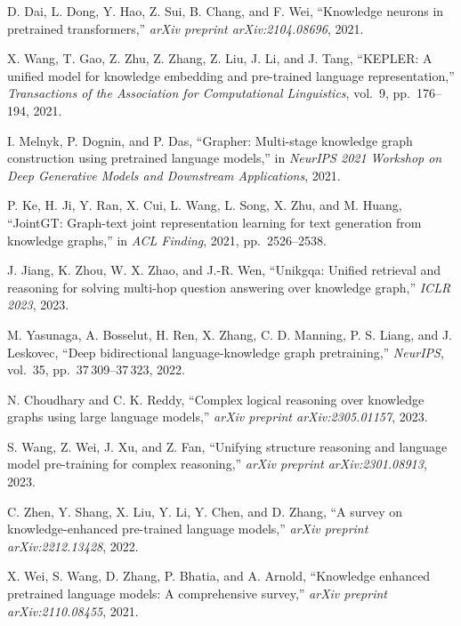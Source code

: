 \begin{enumerate}[leftmargin=2em,label={[\arabic*]}]
\item D. Dai, L. Dong, Y. Hao, Z. Sui, B. Chang, and F. Wei, ``Knowledge neurons in pretrained transformers,'' \textit{arXiv preprint arXiv:2104.08696}, 2021.

\item X. Wang, T. Gao, Z. Zhu, Z. Zhang, Z. Liu, J. Li, and J. Tang, ``KEPLER: A unified model for knowledge embedding and pre-trained language representation,'' \textit{Transactions of the Association for Computational Linguistics}, vol.~9, pp.~176--194, 2021.

\item I. Melnyk, P. Dognin, and P. Das, ``Grapher: Multi-stage knowledge graph construction using pretrained language models,'' in \textit{NeurIPS 2021 Workshop on Deep Generative Models and Downstream Applications}, 2021.

\item P. Ke, H. Ji, Y. Ran, X. Cui, L. Wang, L. Song, X. Zhu, and M. Huang, ``JointGT: Graph-text joint representation learning for text generation from knowledge graphs,'' in \textit{ACL Finding}, 2021, pp.~2526--2538.

\item J. Jiang, K. Zhou, W. X. Zhao, and J.-R. Wen, ``Unikgqa: Unified retrieval and reasoning for solving multi-hop question answering over knowledge graph,'' \textit{ICLR 2023}, 2023.

\item M. Yasunaga, A. Bosselut, H. Ren, X. Zhang, C. D. Manning, P. S. Liang, and J. Leskovec, ``Deep bidirectional language-knowledge graph pretraining,'' \textit{NeurIPS}, vol.~35, pp.~37\,309--37\,323, 2022.

\item N. Choudhary and C. K. Reddy, ``Complex logical reasoning over knowledge graphs using large language models,'' \textit{arXiv preprint arXiv:2305.01157}, 2023.

\item S. Wang, Z. Wei, J. Xu, and Z. Fan, ``Unifying structure reasoning and language model pre-training for complex reasoning,'' \textit{arXiv preprint arXiv:2301.08913}, 2023.

\item C. Zhen, Y. Shang, X. Liu, Y. Li, Y. Chen, and D. Zhang, ``A survey on knowledge-enhanced pre-trained language models,'' \textit{arXiv preprint arXiv:2212.13428}, 2022.

\item X. Wei, S. Wang, D. Zhang, P. Bhatia, and A. Arnold, ``Knowledge enhanced pretrained language models: A comprehensive survey,'' \textit{arXiv preprint arXiv:2110.08455}, 2021.


\end{enumerate}
